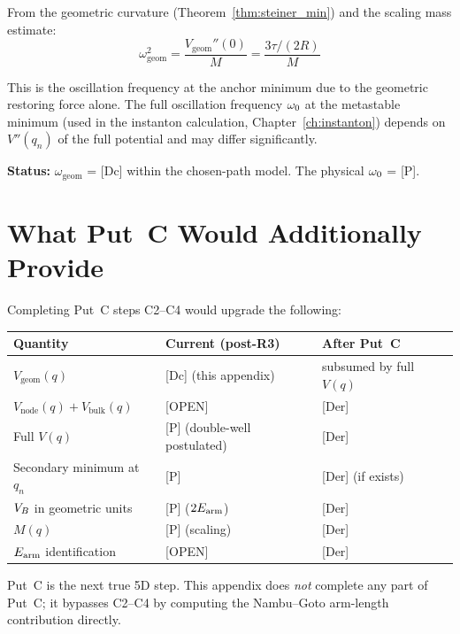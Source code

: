 From the geometric curvature (Theorem~\ref{thm:steiner_min}) and the
scaling mass estimate:
\begin{equation}
    \omega_{\mathrm{geom}}^2 = \frac{V_{\mathrm{geom}}''(0)}{M}
    = \frac{3\tau/(2R)}{M}
    \label{eq:omega_geom}
\end{equation}

This is the oscillation frequency at the anchor minimum due to the geometric
restoring force alone. The full oscillation frequency $\omega_0$ at the
metastable minimum (used in the instanton calculation,
Chapter~\ref{ch:instanton}) depends on $V''(q_n)$ of the full potential
and may differ significantly.

\textbf{Status:} $\omega_{\mathrm{geom}}$ = [Dc] within the chosen-path
model. The physical $\omega_0$ = [P].

\section{What Put~C Would Additionally Provide}
\label{sec:vq:putc}

Completing Put~C steps C2--C4 would upgrade the following:

\begin{center}
\begin{tabular}{lll}
\toprule
\textbf{Quantity} & \textbf{Current (post-R3)} & \textbf{After Put~C} \\
\midrule
$V_{\mathrm{geom}}(q)$ & [Dc] (this appendix) & subsumed by full $V(q)$ \\
$V_{\mathrm{node}}(q) + V_{\mathrm{bulk}}(q)$ & [OPEN] & [Der] \\
Full $V(q)$ & [P] (double-well postulated) & [Der] \\
Secondary minimum at $q_n$ & [P] & [Der] (if exists) \\
$V_B$ in geometric units & [P] ($2E_{\text{arm}}$) & [Der] \\
$M(q)$ & [P] (scaling) & [Der] \\
$E_{\text{arm}}$ identification & [OPEN] & [Der] \\
\bottomrule
\end{tabular}
\end{center}

\noindent Put~C is the next true 5D step. This appendix does \emph{not}
complete any part of Put~C; it bypasses C2--C4 by computing the Nambu--Goto
arm-length contribution directly.

